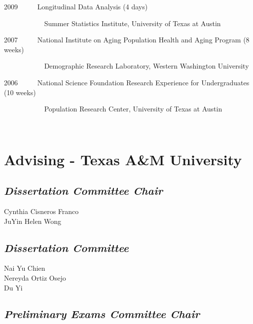 \documentclass[11pt,]{article}
\begin{document}
2009 ~ ~ ~ Longitudinal Data Analysis (4 days)\\
\strut ~ ~ ~ ~ ~ ~ ~ Summer Statistics Institute, University of Texas at
Austin

2007 ~ ~ ~ National Institute on Aging Population Health and Aging
Program (8 weeks)\\
\strut ~ ~ ~ ~ ~ ~ ~ Demographic Research Laboratory, Western Washington
University

2006 ~ ~ ~ National Science Foundation Research Experience for
Undergraduates (10 weeks)\\
\strut ~ ~ ~ ~ ~ ~ ~ Population Research Center, University of Texas at
Austin

~

\section{Advising - Texas A\&M
University}\label{advising---texas-am-university}

\subsection{\texorpdfstring{\emph{Dissertation Committee
Chair}}{Dissertation Committee Chair}}\label{dissertation-committee-chair}

\setlength{\leftskip}{1cm}

Cynthia Cisneros Franco\\
JuYin Helen Wong

\setlength{\leftskip}{0cm}

\subsection{\texorpdfstring{\emph{Dissertation
Committee}}{Dissertation Committee}}\label{dissertation-committee}

\setlength{\leftskip}{1cm}

Nai Yu Chien\\
Nereyda Ortiz Osejo\\
Du Yi

\setlength{\leftskip}{0cm}

\subsection{\texorpdfstring{\emph{Preliminary Exams Committee
Chair}}{Preliminary Exams Committee Chair}}\label{preliminary-exams-committee-chair}

\setlength{\leftskip}{1cm}
\end{document}
